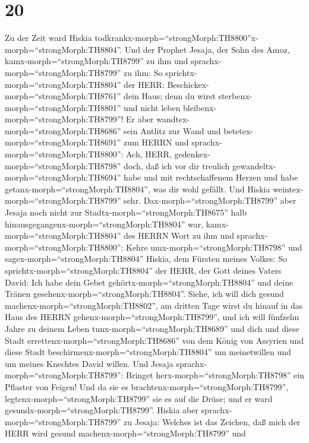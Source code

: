 \hypertarget{section-19}{%
\section{20}\label{section-19}}

 Zu der Zeit ward Hiskia
todkrankx-morph=``strongMorph:TH8800''x-morph=``strongMorph:TH8804''.
Und der Prophet Jesaja, der Sohn des Amoz,
kamx-morph=``strongMorph:TH8799'' zu ihm und
sprachx-morph=``strongMorph:TH8799'' zu ihm: So
sprichtx-morph=``strongMorph:TH8804'' der HERR:
Beschickex-morph=``strongMorph:TH8761'' dein Haus; denn du wirst
sterbenx-morph=``strongMorph:TH8801'' und nicht leben
bleibenx-morph=``strongMorph:TH8799''!  Er aber
wandtex-morph=``strongMorph:TH8686'' sein Antlitz zur Wand und
betetex-morph=``strongMorph:TH8691'' zum HERRN und
sprachx-morph=``strongMorph:TH8800'':  Ach, HERR,
gedenkex-morph=``strongMorph:TH8798'' doch, daß ich vor dir treulich
gewandeltx-morph=``strongMorph:TH8694'' habe und mit rechtschaffenem
Herzen und habe getanx-morph=``strongMorph:TH8804'', was dir wohl
gefällt. Und Hiskia weintex-morph=``strongMorph:TH8799'' sehr.
 Dax-morph=``strongMorph:TH8799'' aber Jesaja noch nicht zur
Stadtx-morph=``strongMorph:TH8675'' halb
hinausgegangenx-morph=``strongMorph:TH8804'' war,
kamx-morph=``strongMorph:TH8804'' des HERRN Wort zu ihm und
sprachx-morph=``strongMorph:TH8800'':  Kehre
umx-morph=``strongMorph:TH8798'' und sagex-morph=``strongMorph:TH8804''
Hiskia, dem Fürsten meines Volkes: So
sprichtx-morph=``strongMorph:TH8804'' der HERR, der Gott deines Vaters
David: Ich habe dein Gebet gehörtx-morph=``strongMorph:TH8804'' und
deine Tränen gesehenx-morph=``strongMorph:TH8804''. Siehe, ich will dich
gesund machenx-morph=``strongMorph:TH8802'', am dritten Tage wirst du
hinauf in das Haus des HERRN gehenx-morph=``strongMorph:TH8799'',
 und ich will fünfzehn Jahre zu deinem Leben
tunx-morph=``strongMorph:TH8689'' und dich und diese Stadt
errettenx-morph=``strongMorph:TH8686'' von dem König von Assyrien und
diese Stadt beschirmenx-morph=``strongMorph:TH8804'' um meinetwillen und
um meines Knechtes David willen.  Und Jesaja
sprachx-morph=``strongMorph:TH8799'': Bringet
herx-morph=``strongMorph:TH8798'' ein Pflaster von Feigen! Und da sie es
brachtenx-morph=``strongMorph:TH8799'',
legtenx-morph=``strongMorph:TH8799'' sie es auf die Drüse; und er ward
gesundx-morph=``strongMorph:TH8799''.  Hiskia aber
sprachx-morph=``strongMorph:TH8799'' zu Jesaja: Welches ist das Zeichen,
daß mich der HERR wird gesund machenx-morph=``strongMorph:TH8799'' und
